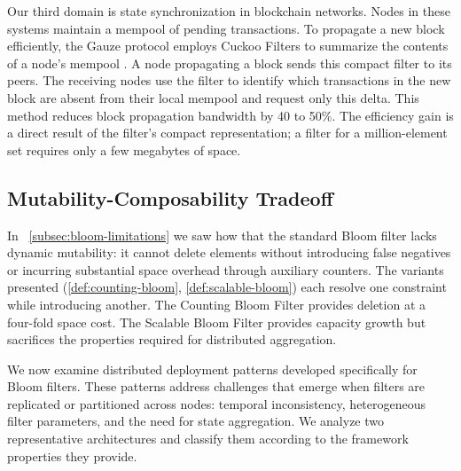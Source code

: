 Our third domain is state synchronization in blockchain networks. Nodes in these systems maintain a mempool of pending transactions. To propagate a new block efficiently, the Gauze protocol employs Cuckoo Filters to summarize the contents of a node's mempool \cite{ding2023gauze}. A node propagating a block sends this compact filter to its peers. The receiving nodes use the filter to identify which transactions in the new block are absent from their local mempool and request only this delta. This method reduces block propagation bandwidth by 40 to 50\%. The efficiency gain is a direct result of the filter's compact representation; a filter for a million-element set requires only a few megabytes of space.


\subsection{Mutability-Composability Tradeoff}

In ~\ref{subsec:bloom-limitations} we saw how that the standard Bloom filter lacks dynamic mutability: it cannot delete elements without introducing false negatives or incurring substantial space overhead through auxiliary counters. The variants presented (\ref{def:counting-bloom}, \ref{def:scalable-bloom}) each resolve one constraint while introducing another. The Counting Bloom Filter provides deletion at a four-fold space cost. The Scalable Bloom Filter provides capacity growth but sacrifices the properties required for distributed aggregation.

We now examine distributed deployment patterns developed specifically for Bloom filters. These patterns address challenges that emerge when filters are replicated or partitioned across nodes: temporal inconsistency, heterogeneous filter parameters, and the need for state aggregation. We analyze two representative architectures and classify them according to the framework properties they provide.

